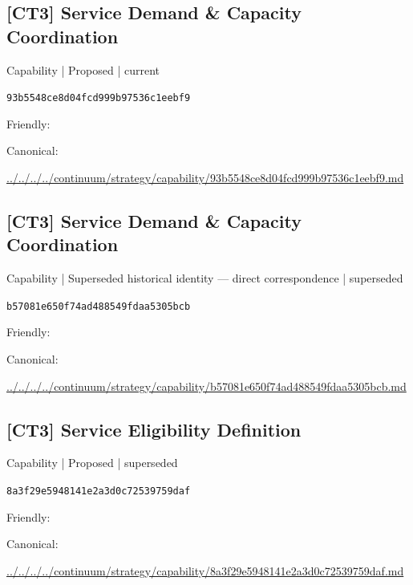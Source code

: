 \documentclass[10pt,a4paper]{article}
\begin{document}
\subsection*{[CT3] Service Demand \& Capacity Coordination}
{\small Capability | Proposed | current}\par
\texttt{93b5548ce8d04fcd999b97536c1eebf9}\par
Friendly: \par
Canonical: \par
{\footnotesize\url{../../../../continuum/strategy/capability/93b5548ce8d04fcd999b97536c1eebf9.md}}\par
\subsection*{[CT3] Service Demand \& Capacity Coordination}
{\small Capability | Superseded historical identity — direct correspondence | superseded}\par
\texttt{b57081e650f74ad488549fdaa5305bcb}\par
Friendly: \par
Canonical: \par
{\footnotesize\url{../../../../continuum/strategy/capability/b57081e650f74ad488549fdaa5305bcb.md}}\par
\subsection*{[CT3] Service Eligibility Definition}
{\small Capability | Proposed | superseded}\par
\texttt{8a3f29e5948141e2a3d0c72539759daf}\par
Friendly: \par
Canonical: \par
{\footnotesize\url{../../../../continuum/strategy/capability/8a3f29e5948141e2a3d0c72539759daf.md}}\par
\end{document}
